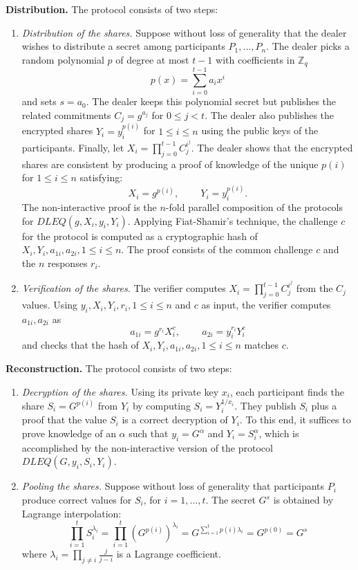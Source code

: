 \documentclass[11pt]{article}
\theoremstyle{definition}
\theoremstyle{remark}
\begin{document}
\textbf{Distribution.} The protocol consists of two steps:
\begin{enumerate}
\item \textit{Distribution of the shares.} Suppose without loss of generality that the dealer wishes to distribute a secret among participants $P_1, ..., P_n$. The dealer picks a random polynomial $p$ of degree at most $t - 1$ with coefficients in $\mathbb{Z}_q$
$$p(x) = \sum_{i = 0}^{t - 1} a_i x^i$$
and sets $s = a_0$. The dealer keeps this polynomial secret but publishes the related commitments $C_j = g^{a_j}$ for $0 \leq j < t$. The dealer also publishes the encrypted shares $Y_i = y_i^{p(i)}$ for $1 \leq i \leq n$ using the public keys of the participants. Finally, let $X_i = \prod_{j = 0}^{t - 1} C_j^{i^j}$. The dealer shows that the encrypted shares are consistent by producing a proof of knowledge of the unique $p(i)$ for $1 \leq i \leq n$ satisfying:
$$X_i = g^{p(i)}, \phantom{ABC} Y_i = y_i^{p(i)}.$$
The non-interactive proof is the $n$-fold parallel composition of the protocols for $DLEQ(g, X_i, y_i, Y_i)$. Applying Fiat-Shamir's technique, the challenge $c$ for the protocol is computed as a cryptographic hash of $X_i, Y_i, a_{1i}, a_{2i}, 1 \leq i \leq n$. The proof consists of the common challenge $c$ and the $n$ responses $r_i$.
\item \textit{Verification of the shares.} The verifier computes $X_i = \prod_{j = 0}^{t - 1} C_j^{i^j}$ from the $C_j$ values. Using $y_i, X_i, Y_i, r_i, 1 \leq i \leq n$ and $c$ as input, the verifier computes $a_{1i}, a_{2i}$ as
$$a_{1i} = g^{r_i} X_i^{c}, \phantom{ABC} a_{2i} = y_i^{r_i} Y_i^{c}$$
and checks that the hash of $X_i, Y_i, a_{1i}, a_{2i}, 1 \leq i \leq n$ matches $c$.
\end{enumerate}

\textbf{Reconstruction.} The protocol consists of two steps:
\begin{enumerate}
\item \textit{Decryption of the shares.} Using its private key $x_i$, each participant finds the share $S_i = G^{p(i)}$ from $Y_i$ by computing $S_i = Y_i^{1 / x_i}$. They publish $S_i$ plus a proof that the value $S_i$ is a correct decryption of $Y_i$. To this end, it suffices to prove knowledge of an $\alpha$ such that $y_i = G^\alpha$ and $Y_i = S_i^\alpha$, which is accomplished by the non-interactive version of the protocol $DLEQ(G, y_i, S_i, Y_i)$.
\item \textit{Pooling the shares.} Suppose without loss of generality that participants $P_i$ produce correct values for $S_i$, for $i = 1, ..., t$. The secret $G^s$ is obtained by Lagrange interpolation:
$$\prod_{i = 1}^{t} S_i^{\lambda_i} = \prod_{i = 1}^{t} \left(G^{p(i)}\right)^{\lambda_i} = G^{\sum_{i = 1}^{t} p(i) \lambda_i} = G^{p(0)} = G^s$$
where $\lambda_i = \prod_{j \neq i} \frac{j}{j - i}$ is a Lagrange coefficient.
\end{enumerate}
\end{document}
